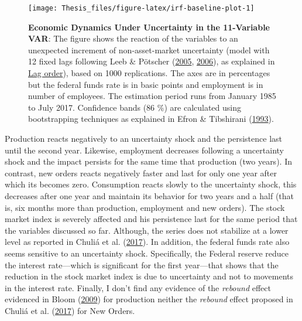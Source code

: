 \documentclass[12pt,twoside]{reedthesis}
\begin{document}
\begin{figure}

{\centering \texttt{[image: Thesis\_files/figure-latex/irf-baseline-plot-1]} 

}

\caption[Economic Dynamics Under Uncertainty in the 11-Variable VAR]{\textbf{Economic Dynamics Under Uncertainty in the 11-Variable VAR}: The figure shows the reaction of the variables to an unexpected increment of non-asset-market uncertainty (model with 12 fixed lags following Leeb \& Pötscher (\protect\hyperlink{ref-leebpots:2005}{2005}, \protect\hyperlink{ref-leebpots:2006}{2006}), as explained in \protect\hyperlink{lag-order}{Lag order}), based on 1000 replications. The axes are in percentages but the federal funds rate is in basic points and employment is in number of employees. The estimation period runs from January 1985 to July 2017. Confidence bands (86 \%) are calculated using bootstrapping techniques as explained in Efron \& Tibshirani (\protect\hyperlink{ref-efrotibs:1993}{1993}).}\label{fig:irf-baseline-plot}
\end{figure}
Production reacts negatively to an uncertainty shock and the persistence last until the second year. Likewise, employment decreases following a uncertainty shock and the impact persists for the same time that production (two years). In contrast, new orders reacts negatively faster and last for only one year after which its becomes zero. Consumption reacts slowly to the uncertainty shock, this decreases after one year and maintain its behavior for two years and a half (that is, six months more than production, employment and new orders). The stock market index is severely affected and his persistence last for the same period that the variables discussed so far. Although, the series does not stabilize at a lower level as reported in Chuliá et al. (\protect\hyperlink{ref-chuletal:2017}{2017}). In addition, the federal funds rate also seems sensitive to an uncertainty shock. Specifically, the Federal reserve reduce the interest rate---which is significant for the first year---that shows that the reduction in the stock market index is due to uncertainty and not to movements in the interest rate. Finally, I don't find any evidence of the \emph{rebound} effect evidenced in Bloom (\protect\hyperlink{ref-bloom:2009}{2009}) for production neither the \emph{rebound} effect proposed in Chuliá et al. (\protect\hyperlink{ref-chuletal:2017}{2017}) for New Orders.
\end{document}
